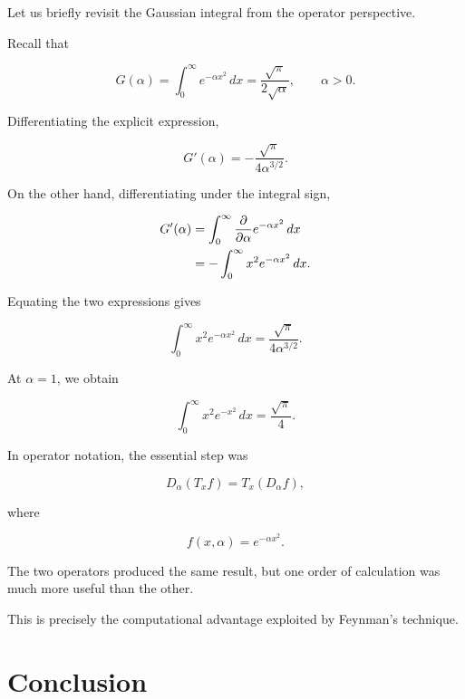 \documentclass[11pt,a4paper]{article}
\theoremstyle{definition}
\theoremstyle{remark}
\begin{document}
Let us briefly revisit
the Gaussian integral
from the operator perspective.

Recall that

\begin{equation}
    G(\alpha)
    =
    \int_0^\infty
    e^{-\alpha x^2}\,dx
    =
    \frac{\sqrt{\pi}}
         {2\sqrt{\alpha}},
    \qquad \alpha>0.
\end{equation}

Differentiating the
explicit expression,

\begin{equation}
    G'(\alpha)
    =
    -\frac{\sqrt{\pi}}
          {4\alpha^{3/2}}.
\end{equation}

On the other hand,
differentiating under
the integral sign,

\begin{align}
    G'(\alpha)
    &=
    \int_0^\infty
    \frac{\partial}{\partial\alpha}
    e^{-\alpha x^2}\,dx
    \notag\\
    &=
    -\int_0^\infty
    x^2e^{-\alpha x^2}\,dx.
\end{align}

Equating the two
expressions gives

\[
    \int_0^\infty
    x^2e^{-\alpha x^2}\,dx
    =
    \frac{\sqrt{\pi}}
         {4\alpha^{3/2}}.
\]

At $\alpha=1$, we obtain

\begin{equation}
    \boxed{
    \int_0^\infty
    x^2e^{-x^2}\,dx
    =
    \frac{\sqrt{\pi}}{4}.
    }
\end{equation}

In operator notation,
the essential step was

\[
    D_\alpha(T_xf)
    =
    T_x(D_\alpha f),
\]

where

\[
    f(x,\alpha)=e^{-\alpha x^2}.
\]

The two operators
produced the same result,
but one order of
calculation was much
more useful than
the other.

This is precisely
the computational
advantage exploited
by Feynman's technique.







\section{Conclusion}
\end{document}
